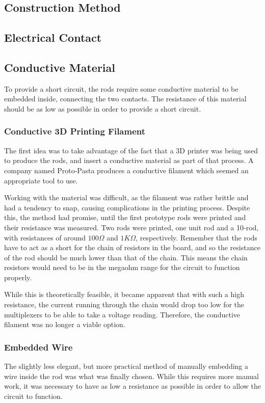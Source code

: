 \subsection{Construction Method}
\subsection{Electrical Contact}
\subsection{Conductive Material}

To provide a short circuit, the rods require some conductive material to be embedded inside, connecting the two contacts. The resistance of this material should be as low as possible in order to provide a short circuit.

\subsubsection{Conductive 3D Printing Filament}
The first idea was to take advantage of the fact that a 3D printer was being used to produce the rods, and insert a conductive material as part of that process. A company named Proto-Pasta produces a conductive filament \cite{Composit79:online} which seemed an appropriate tool to use. 

Working with the material was difficult, as the filament was rather brittle and had a tendency to snap, causing complications in the printing process. Despite this, the method had promise, until the first prototype rods were printed and their resistance was measured. Two rods were printed, one unit rod and a 10-rod, with resistances of around $100\Omega$ and $1K\Omega$, respectively. Remember that the rods have to act as a short for the chain of resistors in the board, and so the resistance of the rod should be much lower than that of the chain. This means the chain resistors would need to be in the megaohm range for the circuit to function properly. 

While this is theoretically feasible, it became apparent that with such a high resistance, the current running through the chain would drop too low for the multiplexers to be able to take a voltage reading. Therefore, the conductive filament was no longer a viable option.

\subsubsection{Embedded Wire}
The slightly less elegant, but more practical method of manually embedding a wire inside the rod was what was finally chosen. While this requires more manual work, it was necessary to have as low a resistance as possible in order to allow the circuit to function. 

